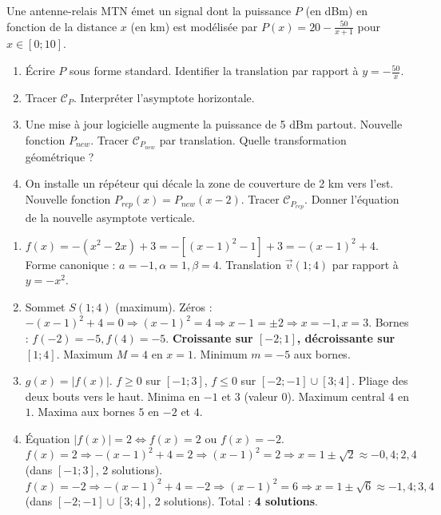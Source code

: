 \documentclass[11pt]{article}
\begin{document}
\begin{exercice}
Une antenne-relais MTN émet un signal dont la puissance $P$ (en dBm) en fonction de la distance $x$ (en km) est modélisée par $P(x) = 20 - \frac{50}{x+1}$ pour $x \in [0; 10]$.
\begin{enumerate}
    \item Écrire $P$ sous forme standard. Identifier la translation par rapport à $y=-\frac{50}{x}$.
    \item Tracer $\mathcal{C}_P$. Interpréter l'asymptote horizontale.
    \item Une mise à jour logicielle augmente la puissance de 5 dBm partout. Nouvelle fonction $P_{new}$. Tracer $\mathcal{C}_{P_{new}}$ par translation. Quelle transformation géométrique ?
    \item On installe un répéteur qui décale la zone de couverture de 2 km vers l'est. Nouvelle fonction $P_{rep}(x) = P_{new}(x-2)$. Tracer $\mathcal{C}_{P_{rep}}$. Donner l'équation de la nouvelle asymptote verticale.
\end{enumerate}
\end{exercice}

\begin{corrige}[Exercice 1]
\begin{enumerate}
    \item $f(x) = -(x^2 - 2x) + 3 = -[(x-1)^2 - 1] + 3 = -(x-1)^2 + 4$. Forme canonique : $a=-1, \alpha=1, \beta=4$. Translation $\vec{v}(1;4)$ par rapport à $y=-x^2$.
    \item Sommet $S(1;4)$ (maximum). Zéros : $-(x-1)^2+4=0 \Rightarrow (x-1)^2=4 \Rightarrow x-1=\pm 2 \Rightarrow x=-1, x=3$. Bornes : $f(-2)=-5, f(4)=-5$. \textbf{Croissante sur $[-2;1]$, décroissante sur $[1;4]$}. Maximum $M=4$ en $x=1$. Minimum $m=-5$ aux bornes.
    \item $g(x)=|f(x)|$. $f \ge 0$ sur $[-1;3]$, $f \le 0$ sur $[-2;-1] \cup [3;4]$. Pliage des deux bouts vers le haut. Minima en $-1$ et $3$ (valeur 0). Maximum central $4$ en $1$. Maxima aux bornes $5$ en $-2$ et $4$.
    \item Équation $|f(x)|=2 \Leftrightarrow f(x)=2$ ou $f(x)=-2$.
        $f(x)=2 \Rightarrow -(x-1)^2+4=2 \Rightarrow (x-1)^2=2 \Rightarrow x=1\pm\sqrt{2} \approx -0,4 ; 2,4$ (dans $[-1;3]$, 2 solutions).
        $f(x)=-2 \Rightarrow -(x-1)^2+4=-2 \Rightarrow (x-1)^2=6 \Rightarrow x=1\pm\sqrt{6} \approx -1,4 ; 3,4$ (dans $[-2;-1] \cup [3;4]$, 2 solutions).
        Total : \textbf{4 solutions}.
\end{enumerate}
\end{corrige}
\end{document}
